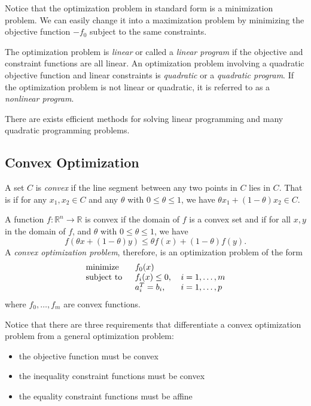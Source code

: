 Notice that the optimization problem in standard form is a minimization problem.  We can easily change it into a maximization problem by minimizing the objective function $-f_0$ subject to the same constraints.

The optimization problem is \textit{linear} or called a \textit{linear program} if the objective and constraint functions are all linear. An optimization problem involving a quadratic objective function and linear constraints is \textit{quadratic} or a \textit{quadratic program}. If the optimization problem is not linear or quadratic, it is referred to as a \textit{nonlinear program}.

There are exists efficient methods for solving linear programming and many quadratic programming problems.

\subsection{Convex Optimization}

A set $C$ is \textit{convex} if the line segment between any two points in $C$ lies in $C$. That is if for any $x_1,x_2\in C$ and any $\theta$ with $0\leq\theta\leq 1$, we have $\theta x_1+(1-\theta)x_2\in C$.

A function $f : \mathbb{R}^n\rightarrow\mathbb{R}$ is convex if the domain of $f$ is a convex set and if for all $x,y$ in the domain of $f$, and $\theta$ with $0\leq\theta\leq 1$, we have
\begin{equation}
	f\left(\theta x+\left(1-\theta\right)y\right)\leq\theta f(x)+(1-\theta)f(y).
	\label{eqn:Convexity}
\end{equation}
A \textit{convex optimization problem}, therefore, is an optimization problem of the form
\begin{equation}
	\begin{tabular}{lll}
		\text{minimize }   & $f_0(x)$        &                 \\
		\text{subject to } & $f_i(x)\leq 0$, & $i=1,\ldots, m$ \\
		& $a_i^T = b_i$,  & $i=1,\ldots, p$ 
	\end{tabular}\label{ConvexOptimization}
\end{equation}
where $f_0,\ldots,f_m$ are convex functions.

Notice that there are three requirements that differentiate a convex optimization problem from a general optimization problem:
\begin{itemize}
	\item the objective function must be convex
	\item the inequality constraint functions must be convex
	\item the equality constraint functions must be affine
\end{itemize}

